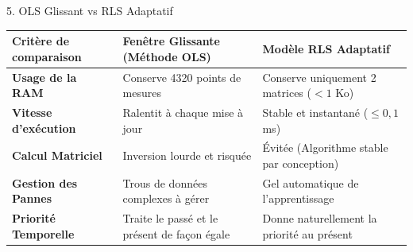 \documentclass[10pt,aspectratio=169]{beamer}
\begin{document}
\begin{frame}{5. OLS Glissant vs RLS Adaptatif}
  \begin{table}[]
    \centering
    \footnotesize
    \begin{tabular}{lll}
      \toprule
      \textbf{Critère de comparaison} & \textbf{Fenêtre Glissante (Méthode OLS)} & \textbf{Modèle RLS Adaptatif} \\
      \midrule
      \textbf{Usage de la RAM} & Conserve 4320 points de mesures & Conserve uniquement 2 matrices ($< 1$ Ko) \\
      \textbf{Vitesse d'exécution} & Ralentit à chaque mise à jour & Stable et instantané ($\le 0,1$ ms) \\
      \textbf{Calcul Matriciel} & Inversion lourde et risquée & Évitée (Algorithme stable par conception) \\
      \textbf{Gestion des Pannes} & Trous de données complexes à gérer & Gel automatique de l'apprentissage \\
      \textbf{Priorité Temporelle} & Traite le passé et le présent de façon égale & Donne naturellement la priorité au présent \\
      \bottomrule
    \end{tabular}
  \end{table}
\end{frame}
\end{document}
